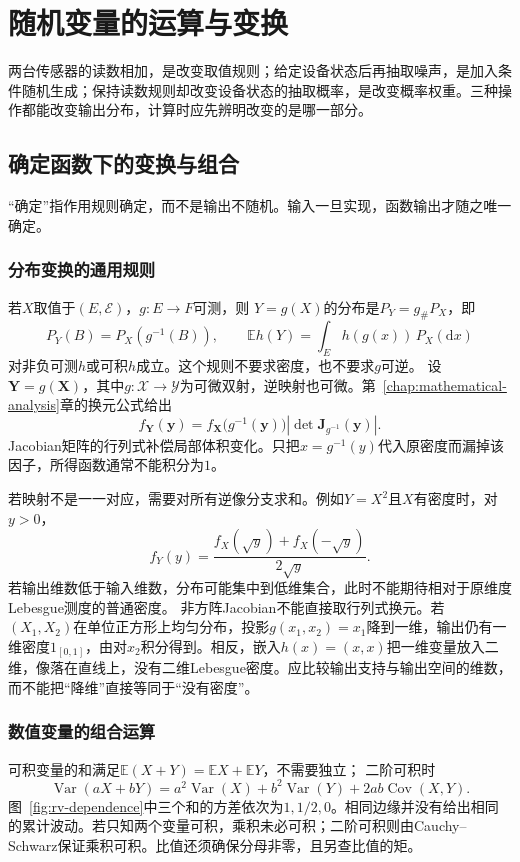 \section{随机变量的运算与变换}
\label{sec:rv-transformations}
\label{sec:probability-random-vectors-transformations}
两台传感器的读数相加，是改变取值规则；给定设备状态后再抽取噪声，是加入条件随机生成；保持读数规则却改变设备状态的抽取概率，是改变概率权重。三种操作都能改变输出分布，计算时应先辨明改变的是哪一部分。

\subsection{确定函数下的变换与组合}
“确定”指作用规则确定，而不是输出不随机。输入一旦实现，函数输出才随之唯一确定。

\subsubsection{分布变换的通用规则}
\label{sec:rv-pushforward}
若\(X\)取值于\((E,\mathcal E)\)，\(g:E\to F\)可测，则
\(Y=g(X)\)的分布是\(P_Y=g_\#P_X\)，即
\[
P_Y(B)=P_X(g^{-1}(B)),\qquad
\mathbb E h(Y)=\int_E h(g(x))\,P_X(\mathrm dx)
\]
对非负可测\(h\)或可积\(h\)成立。这个规则不要求密度，也不要求\(g\)可逆。
设\(\bm{Y}=g(\bm{X})\)，其中\(g:\mathcal{X}\to\mathcal{Y}\)为可微双射，逆映射也可微。第~\ref{chap:mathematical-analysis}章的换元公式给出
\begin{equation}
  f_{\bm{Y}}(\bm{y})
  =
  f_{\bm{X}}\bigl(g^{-1}(\bm{y})\bigr)
  \left|
    \det\bm{J}_{g^{-1}}(\bm{y})
  \right|.
  \label{eq:probability-density-change-variables}
\end{equation}
Jacobian矩阵的行列式补偿局部体积变化。只把\(x=g^{-1}(y)\)代入原密度而漏掉该因子，所得函数通常不能积分为\(1\)。

若映射不是一一对应，需要对所有逆像分支求和。例如\(Y=X^2\)且\(X\)有密度时，对\(y>0\)，
\[ f_Y(y)
  =\frac{f_X(\sqrt{y})+f_X(-\sqrt{y})}{2\sqrt{y}}. \]
若输出维数低于输入维数，分布可能集中到低维集合，此时不能期待相对于原维度Lebesgue测度的普通密度。
非方阵Jacobian不能直接取行列式换元。若
\((X_1,X_2)\)在单位正方形上均匀分布，投影\(g(x_1,x_2)=x_1\)降到一维，输出仍有一维密度\(1_{[0,1]}\)，由对\(x_2\)积分得到。相反，嵌入\(h(x)=(x,x)\)把一维变量放入二维，像落在直线上，没有二维Lebesgue密度。应比较输出支持与输出空间的维数，而不能把“降维”直接等同于“没有密度”。

\subsubsection{数值变量的组合运算}
\label{sec:rv-combinations}
可积变量的和满足\(\mathbb E(X+Y)=\mathbb EX+\mathbb EY\)，不需要独立；
二阶可积时
\[
\operatorname{Var}(aX+bY)
=a^2\operatorname{Var}(X)+b^2\operatorname{Var}(Y)
 +2ab\operatorname{Cov}(X,Y).
\]
图~\ref{fig:rv-dependence}中三个和的方差依次为\(1,1/2,0\)。相同边缘并没有给出相同的累计波动。若只知两个变量可积，乘积未必可积；二阶可积则由Cauchy--Schwarz保证乘积可积。比值还须确保分母非零，且另查比值的矩。


